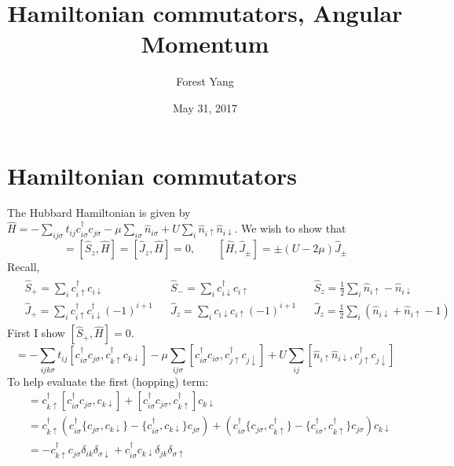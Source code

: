 \documentclass{article}
\title{Hamiltonian commutators, Angular Momentum}
\author{Forest Yang}
\date{May 31, 2017}
\begin{document}
\maketitle
\section{Hamiltonian commutators}
The Hubbard Hamiltonian is given by $\hat{H} = -\sum_{ij\sigma} t_{ij} c_{i\sigma}^\dagger c_{j\sigma} - \mu \sum_{i\sigma} \hat{n}_{i\sigma} + U \sum_{i} \hat{n}_{i\uparrow} \hat{n}_{i\downarrow}$. We wish to show that 
\begin{equation*} [\hat{S}_{\pm}, \hat{H}] = [\hat{S}_z, \hat{H}] = [\hat{J}_z, \hat{H}] = 0, \qquad [\hat{H}, \hat{J}_{\pm}] =  \pm (U-2\mu) \hat{J}_{\pm} \end{equation*}
Recall, 
\begin{align*}
\begin{aligned}
& \hat{S}_+ = \sum_{i} c_{i\uparrow}^\dagger c_{i\downarrow} && \hat{S}_- = \sum_{i} c_{i\downarrow}^\dagger c_{i\uparrow} && \hat{S}_z = \frac{1}{2}\sum_{i}\hat{n}_{i\uparrow} - \hat{n}_{i\downarrow} \\
&\hat{J}_+ = \sum_{i} c_{i\uparrow}^\dagger c_{i\downarrow}^\dagger (-1)^{i+1} && \hat{J}_z = \sum_{i} c_{i\downarrow} c_{i\uparrow} (-1)^{i+1} && \hat{J}_z = \frac{1}{2} \sum_{i} (\hat{n}_{i\downarrow} + \hat{n}_{i\uparrow} - 1)
\end{aligned}
\end{align*}
First I show $[\hat{S}_+, \hat{H}] = 0$. 
\begin{equation*}
[\hat{H},\hat{S}_+] = -\sum_{ijk\sigma} t_{ij}[c_{i\sigma}^\dagger c_{j\sigma}, c_{k\uparrow}^\dagger c_{k\downarrow}] - \mu \sum_{ij\sigma} [c_{i\sigma}^\dagger c_{i\sigma}, c_{j\uparrow}^\dagger c_{j\downarrow}] + U\sum_{ij} [\hat{n}_{i\uparrow} \hat{n}_{i\downarrow}, c_{j\uparrow}^\dagger c_{j\downarrow}]
\end{equation*}
To help evaluate the first (hopping) term:
\begin{align*}
[c_{i\sigma}^\dagger c_{j\sigma}, c_{k\uparrow}^\dagger c_{k\downarrow}] &= c_{k\uparrow}^\dagger [c_{i\sigma}^\dagger c_{j\sigma}, c_{k\downarrow}] + [c_{i\sigma}^\dagger c_{j\sigma}, c_{k\uparrow}^\dagger]c_{k\downarrow} \\
&= c_{k\uparrow}^\dagger (c_{i\sigma}^\dagger \{ c_{j\sigma}, c_{k\downarrow} \} - \{ c_{i\sigma}^\dagger, c_{k\downarrow}\} c_{j\sigma}) + (c_{i\sigma}^\dagger \{ c_{j\sigma}, c_{k\uparrow}^\dagger \} - \{ c_{i\sigma}^\dagger, c_{k\uparrow}^\dagger \} c_{j\sigma})c_{k\downarrow} \\
&= -c_{k\uparrow}^\dagger c_{j\sigma}\delta_{ik}\delta_{\sigma\downarrow} + c_{i\sigma}^\dagger c_{k\downarrow}\delta_{jk}\delta_{\sigma\uparrow}
\end{align*}
\end{document}
